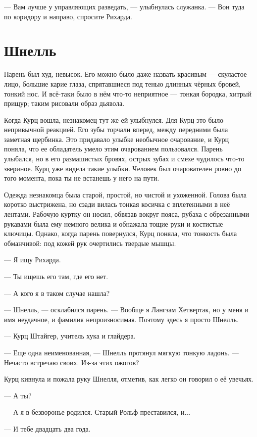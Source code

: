 \documentclass[a4paper,10pt,fleqn]{book}\usepackage{polyglossia}\setdefaultlanguage{english}\setotherlanguage{russian}\defaultfontfeatures{Ligatures=TeX,Mapping=tex-text}\usepackage{xcolor}\definecolor{lightgray}{HTML}{bbbbbb}\color{lightgray}\newcommand{\ml}[3]{\textcolor{black}{#3}}
\begin{document}
--- Вам лучше у управляющих разведать, --- улыбнулась служанка.
--- Вон туда по коридору и направо, спросите Рихарда.

\section{Шнелль}

Парень был худ, невысок.
Его можно было даже назвать красивым --- скуластое лицо, большие карие глаза, спрятавшиеся под тенью длинных чёрных бровей, тонкий нос.
И всё-таки было в нём что-то неприятное --- тонкая бородка, хитрый прищур;
таким рисовали образ дьявола.

Когда Курц вошла, незнакомец тут же ей улыбнулся.
Для Курц это было непривычной реакцией.
Его зубы торчали вперед, между передними была заметная щербинка.
Это придавало улыбке необычное очарование, и Курц поняла, что ее обладатель умело этим очарованием пользовался.
Парень улыбался, но в его размашистых бровях, острых зубах и смехе чудилось что-то звериное.
Курц уже видела такие улыбки.
Человек был очарователен ровно до того момента, пока ты не встанешь у него на пути.

Одежда незнакомца была старой, простой, но чистой и ухоженной.
Голова была коротко выстрижена, но сзади вилась тонкая косичка с вплетенными в неё лентами.
Рабочую куртку он носил, обвязав вокруг пояса, рубаха с обрезанными рукавами была ему немного велика и обнажала тощие руки и костистые ключицы.
Однако, когда парень повернулся, Курц поняла, что тонкость была обманчивой: под кожей рук очертились твердые мышцы. 

--- Я ищу Рихарда.

--- Ты ищешь его там, где его нет.

--- А кого я в таком случае нашла?

--- Шнелль, --- осклабился парень.
--- Вообще я Лангзам Хетвертак, но у меня и имя неудачное, и фамилия непроизносимая.
Поэтому здесь я просто Шнелль.

--- Курц Штайгер, учитель хука и глайдера.

--- Еще одна неименованная, --- Шнелль протянул мягкую тонкую ладонь.
--- Нечасто встречаю своих.
Из-за этих ожогов?

Курц кивнула и пожала руку Шнелля, отметив, как легко он говорил о её увечьях.

--- А ты?

--- А я в безворонье родился.
Старый Рольф преставился, и...

--- И тебе двадцать два года.
\end{document}
